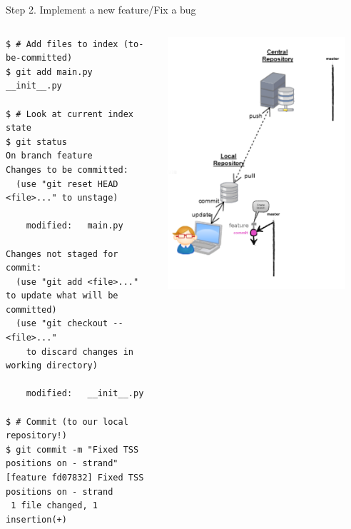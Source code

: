 \begin{frame}[fragile]{Step 2. Implement a new feature/Fix a bug}
\begin{columns}
	\begin{column}{0.6\textwidth}
	\begin{lstlisting}
$ # Add files to index (to-be-committed)
$ git add main.py __init__.py 

$ # Look at current index state
$ git status
On branch feature
Changes to be committed:
  (use "git reset HEAD <file>..." to unstage)

	modified:   main.py

Changes not staged for commit:
  (use "git add <file>..." to update what will be committed)
  (use "git checkout -- <file>..." 
	to discard changes in working directory)

	modified:   __init__.py 

$ # Commit (to our local repository!)
$ git commit -m "Fixed TSS positions on - strand"
[feature fd07832] Fixed TSS positions on - strand
 1 file changed, 1 insertion(+)
  	\end{lstlisting}
  	\end{column}
	\begin{column}{0.4\textwidth}
		\begin{center}
			\includegraphics[width=0.9\textwidth]{branch_commit.png}
		\end{center}
	\end{column}
\end{columns}
\end{frame}

